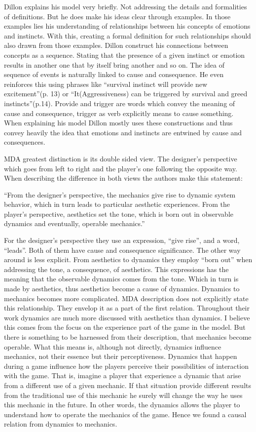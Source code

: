 Dillon explains his model very briefly. Not addressing the details and formalities of definitions. But he does make his ideas clear through examples. In those examples lies his understanding of relationships between his concepts of emotions and instincts. With this, creating a formal definition for such relationships should also drawn from those examples. Dillon construct his connections between concepts as a sequence. Stating that the presence of a given instinct or emotion results in another one that by itself bring another and so on. The idea of sequence of events is naturally linked to cause and consequence. He even reinforces this using phrases like ``survival instinct will provide new excitement''(p. 13) or ``It(Aggressiveness) can be triggered by survival and greed instincts''(p.14). Provide and trigger are words which convey the meaning of cause and consequence, trigger as verb explicitly means to cause something. When explaining his model Dillon mostly uses these constructions and thus convey heavily the idea that emotions and instincts are entwined by cause and consequences. \cite{dillon_way_2010}

MDA greatest distinction is its double sided view. The designer's perspective which goes from left to right and the player's one following the opposite way. When describing the difference in both views the authors make this statement: 

``From the designer's perspective, the mechanics give rise to
dynamic system behavior, which in turn leads to particular
aesthetic experiences. From the player's perspective,
aesthetics set the tone, which is born out in observable
dynamics and eventually, operable mechanics.''
\cite{Hunicke2004}

For the designer's perspective they use an expression, ``give rise'', and a word, ``leads''. Both of them have cause and consequence significance. The other way around is less explicit. From aesthetics to dynamics they employ ``born out'' when addressing the tone, a consequence, of aesthetics. This expressions has the meaning that the observable dynamics comes from the tone. Which in turn is made by aesthetics, thus aesthetics become a cause of dynamics. Dynamics to mechanics becomes more complicated. MDA description does not explicitly state this relationship. They envelop it as a part of the first relation. Throughout their work dynamics are much more discussed with aesthetics than dynamics. I believe this comes from the focus on the experience part of the game in the model. But there is something to be harnessed from their description, that mechanics become operable. What this means is, although not directly, dynamics influence mechanics, not their essence but their perceptiveness. Dynamics that happen during a game influence how the players perceive their possibilities of interaction with the game. That is, imagine a player that experience a dynamic that arise from a different use of a given mechanic. If that situation provide different results from the traditional use of this mechanic he surely will change the way he uses this mechanic in the future. In other words, the dynamics allows the player to understand how to operate the mechanics of the game. Hence we found a causal relation from dynamics to mechanics.